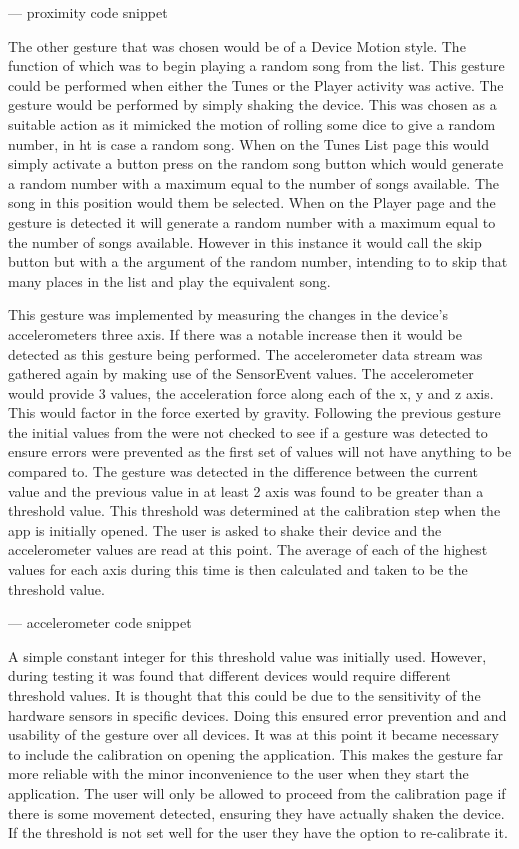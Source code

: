 \documentclass{l4proj}
\begin{document}
--- proximity code snippet

The other gesture that was chosen would be of a Device Motion style. The function of which was to begin playing a random song from the list. This gesture could be performed when either the Tunes or the Player activity was active. The gesture would be performed by simply shaking the device. This was chosen as a suitable action as it mimicked the motion of rolling some dice to give a random number, in ht is case a random song. When on the Tunes List page this would simply activate a button press on the random song button which would generate a random number with a maximum equal to the number of songs available. The song in this position would them be selected. When on the Player page and the gesture is detected it will generate a random number with a maximum equal to the number of songs available. However in this instance it would call the skip button but with a the argument of the random number, intending to to skip that many places in the list and play the equivalent song.

This gesture was implemented by measuring the changes in the device's accelerometers three axis. If there was a notable increase then it would be detected as this gesture being performed. The accelerometer data stream was gathered again by making use of the SensorEvent values. The accelerometer would provide 3 values, the acceleration force along each of the x, y and z axis. This would factor in the force exerted by gravity. Following the previous gesture the initial values from the were not checked to see if a gesture was detected to ensure errors were prevented as the first set of values will not have anything to be compared to. The gesture was detected in the difference between the current value and the previous value in at least 2 axis was found to be greater than a threshold value. This threshold was determined at the calibration step when the app is initially opened. The user is asked to shake their device and the accelerometer values are read at this point. The average of each of the highest values for each axis during this time is then calculated and taken to be the threshold value. 

--- accelerometer code snippet

A simple constant integer for this threshold value was initially used. However, during testing it was found that different devices would require different threshold values. It is thought that this could be due to the sensitivity of the hardware sensors in specific devices. Doing this ensured error prevention and and usability of the gesture over all devices. It was at this point it became necessary to include the calibration on opening the application. This makes the gesture far more reliable with the minor inconvenience to the user when they start the application. The user will only be allowed to proceed from the calibration page if there is some movement detected, ensuring they have actually shaken the device. If the threshold is not set well for the user they have the option to re-calibrate it.
\end{document}
